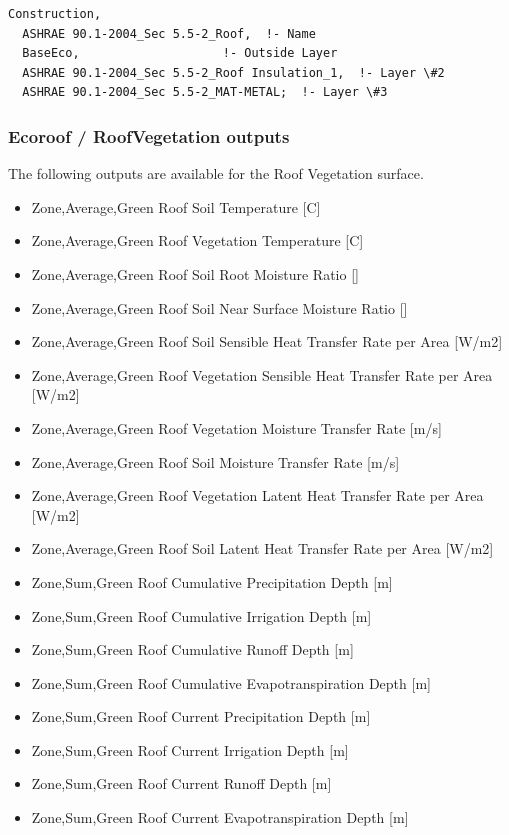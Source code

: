 \begin{lstlisting}
Construction,
  ASHRAE 90.1-2004_Sec 5.5-2_Roof,  !- Name
  BaseEco,                    !- Outside Layer
  ASHRAE 90.1-2004_Sec 5.5-2_Roof Insulation_1,  !- Layer \#2
  ASHRAE 90.1-2004_Sec 5.5-2_MAT-METAL;  !- Layer \#3
\end{lstlisting}

\subsubsection{Ecoroof / RoofVegetation outputs}\label{ecoroof-roofvegetation-outputs}

The following outputs are available for the Roof Vegetation surface.

\begin{itemize}
\item
  Zone,Average,Green Roof Soil Temperature {[}C{]}
\item
  Zone,Average,Green Roof Vegetation Temperature {[}C{]}
\item
  Zone,Average,Green Roof Soil Root Moisture Ratio {[]}
\item
  Zone,Average,Green Roof Soil Near Surface Moisture Ratio {[]}
\item
  Zone,Average,Green Roof Soil Sensible Heat Transfer Rate per Area {[}W/m2{]}
\item
  Zone,Average,Green Roof Vegetation Sensible Heat Transfer Rate per Area {[}W/m2{]}
\item
  Zone,Average,Green Roof Vegetation Moisture Transfer Rate {[}m/s{]}
\item
  Zone,Average,Green Roof Soil Moisture Transfer Rate {[}m/s{]}
\item
  Zone,Average,Green Roof Vegetation Latent Heat Transfer Rate per Area {[}W/m2{]}
\item
  Zone,Average,Green Roof Soil Latent Heat Transfer Rate per Area {[}W/m2{]}
\item
  Zone,Sum,Green Roof Cumulative Precipitation Depth {[}m{]}
\item
  Zone,Sum,Green Roof Cumulative Irrigation Depth {[}m{]}
\item
  Zone,Sum,Green Roof Cumulative Runoff Depth {[}m{]}
\item
  Zone,Sum,Green Roof Cumulative Evapotranspiration Depth {[}m{]}
\item
  Zone,Sum,Green Roof Current Precipitation Depth {[}m{]}
\item
  Zone,Sum,Green Roof Current Irrigation Depth {[}m{]}
\item
  Zone,Sum,Green Roof Current Runoff Depth {[}m{]}
\item
  Zone,Sum,Green Roof Current Evapotranspiration Depth {[}m{]}
\end{itemize}

